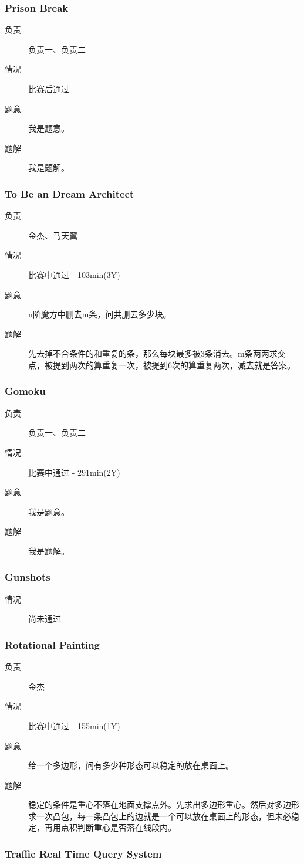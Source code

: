 \documentclass[a4paper, 11pt, nofonts, nocap, fancyhdr]{ctexart}
\newcommand{\problem}[1]{\subsubsection{#1}}
\begin{document}
\problem{Prison Break}

\begin{description}
\item[负责] 负责一、负责二
\item[情况] 比赛后通过
\item[题意]
我是题意。
\item[题解]
我是题解。
\end{description}

\problem{To Be an Dream Architect}

\begin{description}
\item[负责] 金杰、马天翼
\item[情况] 比赛中通过 - 103min(3Y)
\item[题意]
n阶魔方中删去m条，问共删去多少块。
\item[题解]
先去掉不合条件的和重复的条，那么每块最多被3条消去。m条两两求交点，被提到两次的算重复一次，被提到6次的算重复两次，减去就是答案。
\end{description}

\problem{Gomoku}

\begin{description}
\item[负责] 负责一、负责二
\item[情况] 比赛中通过 - 291min(2Y)
\item[题意]
我是题意。
\item[题解]
我是题解。
\end{description}

\problem{Gunshots}

\begin{description}
\item[情况] 尚未通过
\end{description}

\problem{Rotational Painting}

\begin{description}
\item[负责] 金杰
\item[情况] 比赛中通过 - 155min(1Y)
\item[题意]
给一个多边形，问有多少种形态可以稳定的放在桌面上。
\item[题解]
稳定的条件是重心不落在地面支撑点外。先求出多边形重心。然后对多边形求一次凸包，每一条凸包上的边就是一个可以放在桌面上的形态，但未必稳定，再用点积判断重心是否落在线段内。
\end{description}

\problem{Traffic Real Time Query System}
\end{document}
